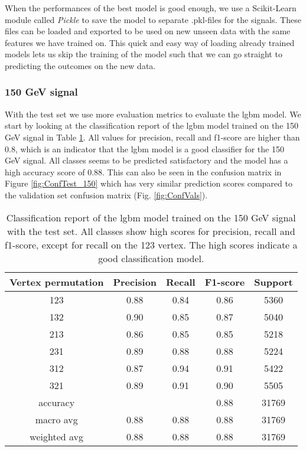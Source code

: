 \documentclass[a4paper, american, 12pt]{report}
\begin{document}
	When the performances of the best model is good enough, we use a Scikit-Learn module called \textit{Pickle} to save the model to separate .pkl-files for the signals. These files can be loaded and exported to be used on new unseen data with the same features we have trained on. This quick and easy way of loading already trained models lets us skip the training of the model such that we can go straight to predicting the outcomes on the new data.
	
	
	\subsubsection{150 GeV signal}
	\label{subsect:Result-Test150}
	With the test set we use more evaluation metrics to evaluate the \acrshort{lgbm} model. We start by looking at the classification report of the \acrshort{lgbm} model trained on the 150 GeV signal in Table \ref{tab:ClassReport_150}. All values for precision, recall and f1-score are higher than 0.8, which is an indicator that the \acrshort{lgbm} model is a good classifier for the 150 GeV signal. All classes seems to be predicted satisfactory and the model has a high accuracy score of 0.88. This can also be seen in the confusion matrix in Figure \ref{fig:ConfTest_150} which has very similar prediction scores compared to the validation set confusion matrix (Fig. \ref{fig:ConfVals}).
	\begin{table}[htb!]
		\centering
		\begin{tabular}{ |c|c|c|c|c| }
			\hline \rule{0pt}{13pt}
			Vertex permutation & Precision & Recall & F1-score & Support \\
			\hline \rule{0pt}{13pt}
			123 & 0.88 & 0.84 & 0.86 & 5360 \\
			\hline \rule{0pt}{13pt}
			132 & 0.90 & 0.85 & 0.87 & 5040 \\
			\hline \rule{0pt}{13pt}
			213 & 0.86 & 0.85 & 0.85 & 5218 \\
			\hline \rule{0pt}{13pt}
			231 & 0.89 & 0.88 & 0.88 & 5224  \\
			\hline \rule{0pt}{13pt}
			312 & 0.87 & 0.94 & 0.91 & 5422 \\
			\hline \rule{0pt}{13pt}
			321 & 0.89 & 0.91 & 0.90 & 5505 \\
			\hline \rule{0pt}{13pt}
			accuracy &   &   &  0.88 & 31769 \\
			\hline \rule{0pt}{13pt}
			macro avg & 0.88 & 0.88 & 0.88 & 31769 \\
			\hline \rule{0pt}{13pt}
			weighted avg & 0.88 & 0.88 & 0.88 & 31769 \\
			\hline
		\end{tabular}	         
		\caption[Classification report of the \acrshort{lgbm} model trained on the 150 GeV signal.]{Classification report of the \acrshort{lgbm} model trained on the 150 GeV signal with the test set. All classes show high scores for precision, recall and f1-score, except for recall on the 123 vertex. The high scores indicate a good classification model.}
		\label{tab:ClassReport_150}
	\end{table} 
\end{document}
